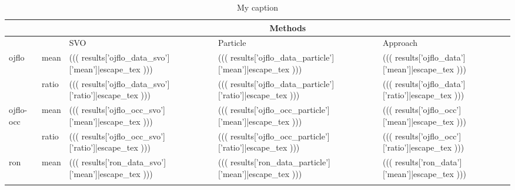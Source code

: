 \begin{table}[]
\centering
\caption{My caption}
\label{my-label}
\begin{tabular}{lllll}
\hline
                           &                            & \multicolumn{3}{c}{Methods}                                                                                                                                                                                                           \\ \hline
                           &                            & SVO                                                                        & Particle                                                                        & Approach                                                               \\ \hline
\multirow{2}{*}{ojflo}     & \multicolumn{1}{l|}{mean}  & \multicolumn{1}{l|}{((( results['ojflo_data_svo']['mean']|escape_tex )))}  & \multicolumn{1}{l|}{((( results['ojflo_data_particle']['mean']|escape_tex )))}  & \multicolumn{1}{l|}{((( results['ojflo_data']['mean']|escape_tex )))}  \\ \cline{2-5}
                           & \multicolumn{1}{l|}{ratio} & \multicolumn{1}{l|}{((( results['ojflo_data_svo']['ratio']|escape_tex )))} & \multicolumn{1}{l|}{((( results['ojflo_data_particle']['ratio']|escape_tex )))} & \multicolumn{1}{l|}{((( results['ojflo_data']['ratio']|escape_tex )))} \\ \hline
\multirow{2}{*}{ojflo-occ} & \multicolumn{1}{l|}{mean}  & \multicolumn{1}{l|}{((( results['ojflo_occ_svo']['mean']|escape_tex )))}   & \multicolumn{1}{l|}{((( results['ojflo_occ_particle']['mean']|escape_tex )))}   & \multicolumn{1}{l|}{((( results['ojflo_occ']['mean']|escape_tex )))}   \\ \cline{2-5}
                           & \multicolumn{1}{l|}{ratio} & \multicolumn{1}{l|}{((( results['ojflo_occ_svo']['ratio']|escape_tex )))}  & \multicolumn{1}{l|}{((( results['ojflo_occ_particle']['ratio']|escape_tex )))}  & \multicolumn{1}{l|}{((( results['ojflo_occ']['ratio']|escape_tex )))}  \\ \hline
\multirow{2}{*}{ron}       & \multicolumn{1}{l|}{mean}  & \multicolumn{1}{l|}{((( results['ron_data_svo']['mean']|escape_tex )))}    & \multicolumn{1}{l|}{((( results['ron_data_particle']['mean']|escape_tex )))}    & \multicolumn{1}{l|}{((( results['ron_data']['mean']|escape_tex )))}    \\ \cline{2-5}

\end{tabular}
\end{table}
